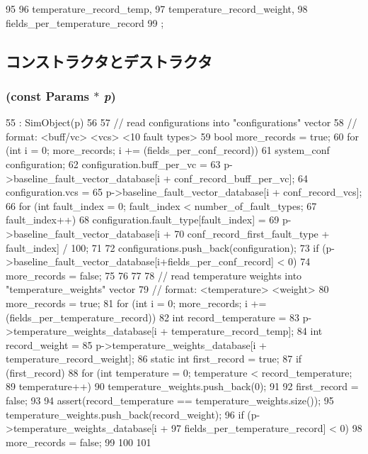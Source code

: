 \begin{DoxyCode}
95     {
96         temperature_record_temp,
97         temperature_record_weight,
98         fields_per_temperature_record
99     };
\end{DoxyCode}


\subsection{コンストラクタとデストラクタ}
\hypertarget{classFaultModel_ad0752b1f7980300e4978b8ed20041fdc}{
\subsubsection[{FaultModel}]{ (const {\bf Params} $\ast$ {\em p})}}
\label{classFaultModel_ad0752b1f7980300e4978b8ed20041fdc}



\begin{DoxyCode}
55                                       : SimObject(p)
56 {
57     // read configurations into "configurations" vector
58     // format: <buff/vc> <vcs> <10 fault types> 
59     bool more_records = true;
60     for (int i = 0; more_records; i += (fields_per_conf_record)){
61         system_conf configuration;
62         configuration.buff_per_vc = 
63             p->baseline_fault_vector_database[i + conf_record_buff_per_vc];
64         configuration.vcs = 
65             p->baseline_fault_vector_database[i + conf_record_vcs];
66         for (int fault_index = 0; fault_index < number_of_fault_types; 
67             fault_index++){
68             configuration.fault_type[fault_index] = 
69                 p->baseline_fault_vector_database[i + 
70                    conf_record_first_fault_type + fault_index] / 100;
71         }
72         configurations.push_back(configuration);
73         if (p->baseline_fault_vector_database[i+fields_per_conf_record] < 0){
74             more_records = false;
75         }
76     }
77 
78     // read temperature weights into "temperature_weights" vector
79     // format: <temperature> <weight>
80     more_records = true;
81     for (int i = 0; more_records; i += (fields_per_temperature_record)){
82         int record_temperature = 
83                p->temperature_weights_database[i + temperature_record_temp];
84         int record_weight =
85                p->temperature_weights_database[i + temperature_record_weight];
86         static int first_record = true;
87         if (first_record){
88             for (int temperature = 0; temperature < record_temperature; 
89                  temperature++){
90                  temperature_weights.push_back(0);
91             }
92             first_record = false;
93         }
94         assert(record_temperature == temperature_weights.size());
95         temperature_weights.push_back(record_weight);
96         if (p->temperature_weights_database[i + 
97                fields_per_temperature_record] < 0){
98             more_records = false;
99         }
100     }
101 }
\end{DoxyCode}


